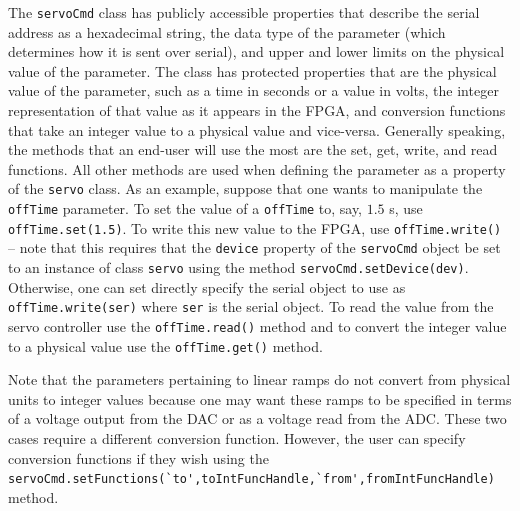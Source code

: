 \documentclass{article}
\begin{document}
The \verb|servoCmd| class has publicly accessible properties that describe the serial address as a hexadecimal string, the data type of the parameter (which determines how it is sent over serial), and upper and lower limits on the physical value of the parameter.  The class has protected properties that are the physical value of the parameter, such as a time in seconds or a value in volts, the integer representation of that value as it appears in the FPGA, and conversion functions that take an integer value to a physical value and vice-versa.  Generally speaking, the methods that an end-user will use the most are the set, get, write, and read functions.  All other methods are used when defining the parameter as a property of the \verb|servo| class.  As an example, suppose that one wants to manipulate the \verb|offTime| parameter.  To set the value of a \verb|offTime| to, say, $1.5$ s, use \verb|offTime.set(1.5)|.  To write this new value to the FPGA, use \verb|offTime.write()| -- note that this requires that the \verb|device| property of the \verb|servoCmd| object be set to an instance of class \verb|servo| using the method \verb|servoCmd.setDevice(dev)|.  Otherwise, one can set directly specify the serial object to use as \verb|offTime.write(ser)| where \verb|ser| is the serial object.  To read the value from the servo controller use the \verb|offTime.read()| method and to convert the integer value to a physical value use the \verb|offTime.get()| method.

Note that the parameters pertaining to linear ramps do not convert from physical units to integer values because one may want these ramps to be specified in terms of a voltage output from the DAC or as a voltage read from the ADC.  These two cases require a different conversion function.  However, the user can specify conversion functions if they wish using the \verb|servoCmd.setFunctions(`to',toIntFuncHandle,`from',fromIntFuncHandle)| method.
\end{document}
